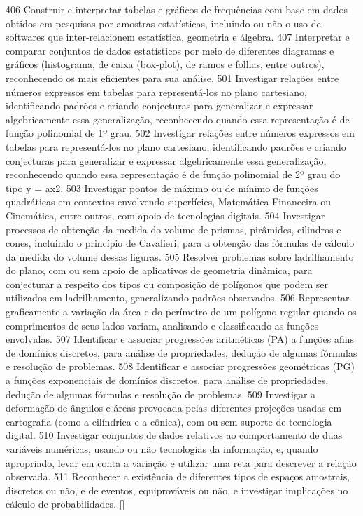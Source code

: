 {{{			}
			{406}{%
				Construir e interpretar tabelas e gráficos de frequências com base em
				dados obtidos em pesquisas por amostras estatísticas, incluindo ou não o uso de softwares
				que inter-relacionem estatística, geometria e álgebra.
			}
			{407}{%
				Interpretar e comparar conjuntos de dados estatísticos por meio de
				diferentes diagramas e gráficos (histograma, de caixa (box-plot), de ramos e folhas, entre
				outros), reconhecendo os mais eficientes para sua análise.
			}
			{501}{%
				Investigar relações entre números expressos em tabelas para
				representá-los no plano cartesiano, identificando padrões e criando conjecturas para
				generalizar e expressar algebricamente essa generalização, reconhecendo quando
				essa representação é de função polinomial de 1º grau.
			}
			{502}{%
				Investigar relações entre números expressos em tabelas para
				representá-los no plano cartesiano, identificando padrões e criando conjecturas para
				generalizar e expressar algebricamente essa generalização, reconhecendo quando
				essa representação é de função polinomial de 2º grau do tipo y = ax2.
			}
			{503}{%
				Investigar pontos de máximo ou de mínimo de funções quadráticas em
				contextos envolvendo superfícies, Matemática Financeira ou Cinemática, entre outros,
				com apoio de tecnologias digitais.
			}
			{504}{%
				Investigar processos de obtenção da medida do volume de prismas,
				pirâmides, cilindros e cones, incluindo o princípio de Cavalieri, para a obtenção das
				fórmulas de cálculo da medida do volume dessas figuras.
			}
			{505}{%
				Resolver problemas sobre ladrilhamento do plano, com ou sem apoio de
				aplicativos de geometria dinâmica, para conjecturar a respeito dos tipos ou composição
				de polígonos que podem ser utilizados em ladrilhamento, generalizando padrões
				observados.
			}
			{506}{%
				Representar graficamente a variação da área e do perímetro de
				um polígono regular quando os comprimentos de seus lados variam, analisando e
				classificando as funções envolvidas.
			}
			{507}{%
				Identificar e associar progressões aritméticas (PA) a funções afins de
				domínios discretos, para análise de propriedades, dedução de algumas fórmulas e
				resolução de problemas.
			}
			{508}{%
				Identificar e associar progressões geométricas (PG) a funções
				exponenciais de domínios discretos, para análise de propriedades, dedução de algumas
				fórmulas e resolução de problemas.
			}
			{509}{%
				Investigar a deformação de ângulos e áreas provocada pelas diferentes
				projeções usadas em cartografia (como a cilíndrica e a cônica), com ou sem suporte de
				tecnologia digital.
			}
			{510}{%
				Investigar conjuntos de dados relativos ao comportamento de duas
				variáveis numéricas, usando ou não tecnologias da informação, e, quando apropriado,
				levar em conta a variação e utilizar uma reta para descrever a relação observada.
			}
			{511}{%
				Reconhecer a existência de diferentes tipos de espaços amostrais,
				discretos ou não, e de eventos, equiprováveis ou não, e investigar implicações no cálculo
				de probabilidades.
			}
	}[\la@invalidhability]
}

